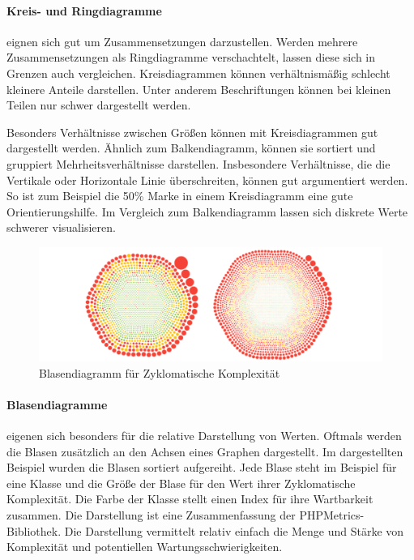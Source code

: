 \paragraph{Kreis- und Ringdiagramme} eignen sich gut um Zusammensetzungen darzustellen. Werden mehrere Zusammensetzungen als Ringdiagramme verschachtelt, lassen diese sich in Grenzen auch vergleichen. Kreisdiagrammen können verhältnismäßig schlecht kleinere Anteile darstellen. Unter anderem Beschriftungen können bei kleinen Teilen nur schwer dargestellt werden.

Besonders Verhältnisse zwischen Größen können mit Kreisdiagrammen gut dargestellt werden. Ähnlich zum Balkendiagramm, können sie sortiert und gruppiert Mehrheitsverhältnisse darstellen. Insbesondere Verhältnisse, die die Vertikale oder Horizontale Linie überschreiten, können gut argumentiert werden. So ist zum Beispiel die 50\% Marke in einem Kreisdiagramm eine gute Orientierungshilfe. Im Vergleich zum Balkendiagramm lassen sich diskrete Werte schwerer visualisieren.

\begin{figure}[htbp]
  \includegraphics[width=\textwidth, height=\textheight, keepaspectratio]
    {resources/bubble-complexity-chart.pdf}
  \caption{Blasendiagramm für Zyklomatische Komplexität}
  \label{bubble-complexity}
\end{figure}
\paragraph{Blasendiagramme} eigenen sich besonders für die relative Darstellung von Werten. Oftmals werden die Blasen zusätzlich an den Achsen eines Graphen dargestellt. Im dargestellten Beispiel wurden die Blasen sortiert aufgereiht. Jede Blase steht im Beispiel für eine Klasse und die Größe der Blase für den Wert ihrer Zyklomatische Komplexität. Die Farbe der Klasse stellt einen Index für ihre Wartbarkeit zusammen. Die Darstellung ist eine Zusammenfassung der PHPMetrics\hyp{}Bibliothek. 
Die Darstellung vermittelt relativ einfach die Menge und Stärke von Komplexität und potentiellen Wartungsschwierigkeiten.


